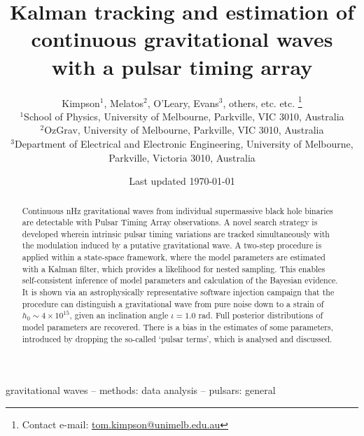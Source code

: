 \documentclass[fleqn,usenatbib,useAMS]{mnras}
\title[Kalman PTA]{Kalman tracking and estimation of continuous gravitational waves with a pulsar timing array}
\author[Kimpson]{Kimpson$^{1}$, Melatos$^{2}$, O'Leary, Evans$^{3}$, others, etc. etc.%
\thanks{Contact e-mail: \href{tom.kimpson@unimelb.edu.au}{tom.kimpson@unimelb.edu.au}}%
\\
$^{1}$School of Physics, University of Melbourne, Parkville, VIC 3010, Australia \\
$^{2}$OzGrav, University of Melbourne, Parkville, VIC 3010, Australia \\
$^{3}$Department of Electrical and Electronic Engineering, University of Melbourne, Parkville, Victoria 3010, Australia }
\date{Last updated \today}
\begin{document}
\label{firstpage}
\pagerange{\pageref{firstpage}--\pageref{lastpage}}
\maketitle

\begin{abstract}	
Continuous nHz gravitational waves from individual supermassive black hole binaries are detectable with Pulsar Timing Array observations. A novel search strategy is developed wherein intrinsic pulsar timing variations are tracked simultaneously with the modulation induced by a putative gravitational wave. A two-step procedure is applied within a state-space framework, where the model parameters are estimated with a Kalman filter, which provides a likelihood for nested sampling. This enables self-consistent inference of model parameters and calculation of the Bayesian evidence. It is shown via an astrophysically representative software injection campaign that the procedure can distinguish a gravitational wave from pure noise down to a strain of $h_0 \sim 4 \times 10^{15}$, given an inclination angle $\iota = 1.0$ rad. Full posterior distributions of model parameters are recovered. There is a bias in the estimates of some parameters, introduced by dropping the so-called `pulsar terms', which is analysed and discussed.
\end{abstract}

\begin{keywords}
gravitational waves -- methods: data analysis -- pulsars: general
\end{keywords}



\begingroup
\let\clearpage\relax
\endgroup
\newpage
\end{document}

